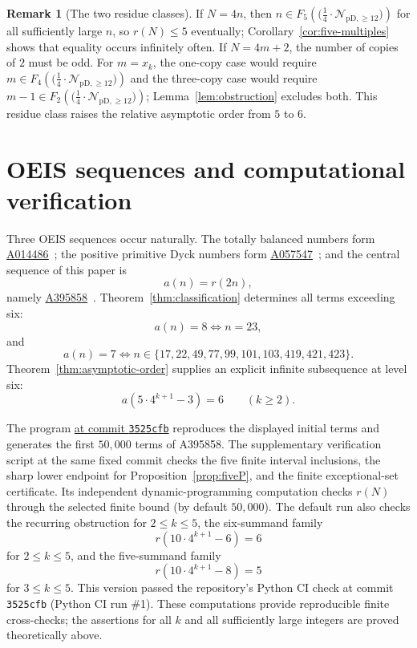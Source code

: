 \documentclass[12pt]{article}
\theoremstyle{plain}
\theoremstyle{definition}
\newtheorem{remark}[theorem]{Remark}
\theoremstyle{plain}
\newcommand{\Pset}{%
  \bigl(\tfrac{1}{4}\cdot\mathcal{N}_{\mathrm{pD},\geq 12}\bigr)%
}
\newcommand{\seqnum}[1]{\href{https://oeis.org/#1}{\rm \underline{#1}}}
\begin{document}
\begin{remark}[The two residue classes]
If $N=4n$, then $n\in F_5(\Pset)$ for all sufficiently large $n$, so
$r(N)\leq5$ eventually; Corollary~\ref{cor:five-multiples} shows that equality
occurs infinitely often.  If $N=4m+2$, the number of copies of $2$ must be odd.
For $m=x_k$, the one-copy case would require $m\in F_4(\Pset)$ and the
three-copy case would require $m-1\in F_2(\Pset)$; Lemma~\ref{lem:obstruction}
excludes both.  This residue class raises the relative asymptotic order from
$5$ to $6$.
\end{remark}

\section{OEIS sequences and computational verification}
\label{sec:oeis}

Three OEIS sequences occur naturally.  The totally balanced numbers form
\seqnum{A014486}~\cite{OEIS-A014486}; the positive primitive Dyck numbers form
\seqnum{A057547}~\cite{OEIS-A057547}; and the central sequence of this paper is
\[
  a(n)=r(2n),
\]
namely \seqnum{A395858}~\cite{OEIS-A395858}.  Theorem~\ref{thm:classification}
determines all terms exceeding six:
\[
  a(n)=8\iff n=23,
\]
and
\[
  a(n)=7\iff
  n\in\{17,22,49,77,99,101,103,419,421,423\}.
\]
Theorem~\ref{thm:asymptotic-order} supplies an explicit infinite subsequence at
level six:
\begin{equation}\label{eq:A395858-six-subsequence}
  a(5\cdot4^{k+1}-3)=6\qquad(k\geq2).
\end{equation}

The program
\href{https://github.com/growupkuriyama-hub/lean_cfg_project/blob/3525cfb/LeanCfgProject/PrimDyck/A395858.py}{ at commit \texttt{3525cfb}}
reproduces the displayed initial terms and generates the first $50{,}000$ terms
of A395858.  The supplementary verification script at the same fixed commit
checks the five finite interval inclusions, the sharp lower endpoint for
Proposition~\ref{prop:fiveP}, and the finite exceptional-set certificate.  Its
independent dynamic-programming computation checks $r(N)$ through the selected
finite bound (by default $50{,}000$).  The default run also checks the recurring
obstruction for $2\leq k\leq5$, the six-summand family
\[
 r(10\cdot4^{k+1}-6)=6
\]
for $2\leq k\leq5$, and the five-summand family
\[
 r(10\cdot4^{k+1}-8)=5
\]
for $3\leq k\leq5$.  This version passed the repository's Python CI check at
commit \texttt{3525cfb} (Python CI run \#1).  These computations provide
reproducible finite cross-checks; the assertions for all $k$ and all sufficiently
large integers are proved theoretically above.
\end{document}
